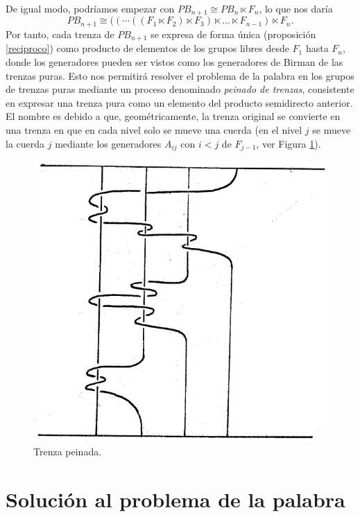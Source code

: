 \documentclass[TFG.tex]{subfiles}
\begin{document}
De igual modo, podríamos empezar con $PB_{n+1}\cong PB_n\ltimes F_n$, lo que nos daría
$$PB_{n+1}\cong ((\cdots ((F_1\ltimes F_2)\ltimes F_3)\ltimes\dots\ltimes F_{n-1})\ltimes F_n.$$
Por tanto, cada trenza de $PB_{n+1}$ se expresa de forma única (proposición \ref{reciproco}) como producto de elementos de los grupos libres desde $F_1$ hasta $F_n$, donde los generadores pueden ser vistos como los generadores de Birman de las trenzas puras. Esto nos permitirá resolver el problema de la palabra en los grupos de trenzas puras mediante un proceso denominado \emph{peinado de trenzas}, consistente en expresar una trenza pura como un elemento del producto semidirecto anterior. El nombre es debido a que, geométricamente, la trenza original se convierte en una trenza en que en cada nivel solo se mueve una cuerda (en el nivel $j$ se mueve la cuerda $j$ mediante los generadores $A_{ij}$ con $i<j$ de $F_{j-1}$, ver Figura \ref{peinada}).


\begin{figure}[h!]
\begin{turn}{1.5}
\includegraphics[scale=0.4]{Imagenes/peinado}
\end{turn}
\caption{Trenza peinada.}\label{peinada}
\end{figure}


\section{Solución al problema de la palabra}\label{simples}
\end{document}
